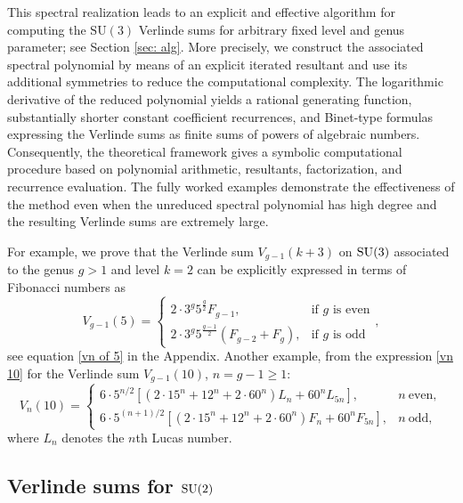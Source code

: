 \documentclass[11pt,reqno]{amsart}
\theoremstyle{remark}
\begin{document}
This spectral realization leads to an explicit and effective algorithm for computing the $\mathrm{SU}(3)$ Verlinde sums for arbitrary fixed level and genus parameter; see Section \ref{sec: alg}. More precisely, we construct the associated spectral polynomial by means of an explicit iterated resultant and use its additional symmetries to reduce the computational complexity. The logarithmic derivative of the reduced polynomial yields a rational generating function, substantially shorter constant coefficient recurrences, and Binet-type formulas expressing the Verlinde sums as finite sums of powers of algebraic numbers. Consequently, the theoretical framework gives a symbolic computational procedure based on polynomial arithmetic, resultants, factorization, and recurrence evaluation. The fully worked examples demonstrate the effectiveness of the method even when the unreduced spectral polynomial has high degree and the resulting Verlinde sums are extremely large.

For example, we prove that the Verlinde sum $V_{g-1}(k+3)$ on  $\text{\rm SU}(3)$ associated to the genus $g>1$ and level $k=2$ can be explicitly expressed in terms of Fibonacci numbers as
$$
V_{g-1}(5)=\left\{
                                                  \begin{array}{ll}
                                                    2\cdot3^{g}5^{\frac{g}{2}}F_{g-1}, &\text{if  } g \text{  is even} \\
                                                    2\cdot3^{g}5^{\frac{g-1}{2}}(F_{g-2} + F_{g}), &\text{if  } g \text{  is odd}
                                                  \end{array}
                                                \right.,
$$
see equation \eqref{vn of 5} in the Appendix. Another example, from the expression \eqref{vn 10} for the Verlinde sum $V_{g-1}(10)$, $n=g-1\geq 1$:
\begin{equation}
V_{n}(10)=
\begin{cases}
\displaystyle
6\cdot 5^{n/2}
\left[(2\cdot 15^n+12^n+2\cdot 60^n)L_n+60^nL_{5n}\right],
& n\ \text{even},\\[4mm]
\displaystyle
6\cdot 5^{(n+1)/2}
\left[(2\cdot 15^n+12^n+2\cdot 60^n)F_n+60^nF_{5n}\right],
& n\ \text{odd},
\end{cases}
\end{equation}
where $L_n$ denotes the $n$th Lucas number.

\subsection{Verlinde sums for \texorpdfstring{$\text{\rm SU}(2)$}{SU(2)}}
\end{document}
